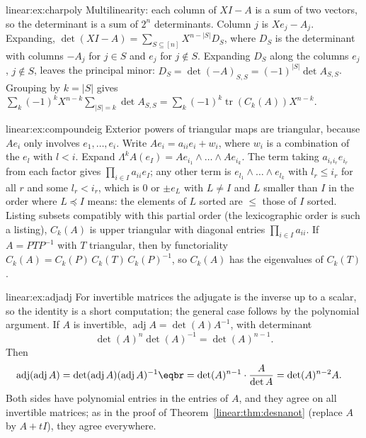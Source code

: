 \begin{solution}{linear:ex:charpoly}
\idea Multilinearity: each column of $XI-A$ is a sum of two vectors, so the determinant is a sum of $2^n$ determinants.
\writeup Column $j$ is $Xe_j-A_j$. Expanding, $\det(XI-A)=\sum_{S\subseteq[n]}X^{n-|S|}D_S$, where $D_S$ is the determinant with
columns $-A_j$ for $j\in S$ and $e_j$ for $j\notin S$. Expanding $D_S$ along the columns $e_j$, $j\notin S$, leaves the
principal minor: $D_S=\det(-A)_{S,S}=(-1)^{|S|}\det A_{S,S}$. Grouping by $k=|S|$ gives
$\sum_k(-1)^kX^{n-k}\sum_{|S|=k}\det A_{S,S}=\sum_k(-1)^k\operatorname{tr}(C_k(A))X^{n-k}$.
\end{solution}

\begin{solution}{linear:ex:compoundeig}
\idea Exterior powers of triangular maps are triangular, because $Ae_i$ only involves $e_1,\dots,e_i$.
\writeup Write $Ae_i=a_{ii}e_i+w_i$, where $w_i$ is a combination of the $e_l$ with $l<i$. Expand
$\Lambda^kA(e_I)=Ae_{i_1}\wedge\dots\wedge Ae_{i_k}$. The term
taking $a_{i_ri_r}e_{i_r}$ from each factor gives $\prod_{i\in I}a_{ii}e_I$; any other term is $e_{l_1}\wedge\dots\wedge e_{l_k}$ with
$l_r\le i_r$ for all $r$ and some $l_r<i_r$, which is $0$ or $\pm e_L$ with $L\neq I$ and $L$ smaller than $I$ in the
order where $L\preceq I$ means: the elements of $L$ sorted are $\le$ those of $I$ sorted. Listing subsets compatibly
with this partial order (the lexicographic order is such a listing), $C_k(A)$ is upper triangular with diagonal entries
$\prod_{i\in I}a_{ii}$. If $A=PTP^{-1}$ with $T$ triangular, then by functoriality $C_k(A)=C_k(P)\,C_k(T)\,C_k(P)^{-1}$, so
$C_k(A)$ has the eigenvalues of $C_k(T)$.
\end{solution}

\begin{solution}{linear:ex:adjadj}
\idea For invertible matrices the adjugate is the inverse up to a scalar, so the identity is a short computation; the
general case follows by the polynomial argument.
\writeup If $A$ is invertible, $\operatorname{adj}A=\det(A)A^{-1}$, with determinant
\[
\det(A)^n\det(A)^{-1}=\det(A)^{n-1}.
\]
Then
\[
\begin{aligned}\operatorname{adj}(\operatorname{adj}A)&=\det(\operatorname{adj}A)(\operatorname{adj}A)^{-1}\eqbr=\det(A)^{n-1}\cdot\frac{A}{\det A}=\det(A)^{n-2}A.\end{aligned}
\]
Both sides have polynomial entries in the entries of $A$, and they agree on all invertible matrices; as in the proof of
Theorem~\ref{linear:thm:desnanot} (replace $A$ by $A+tI$), they agree everywhere.
\end{solution}

